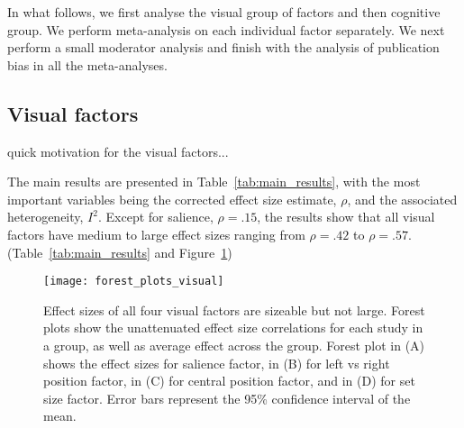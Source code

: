 \documentclass{article}
\begin{document}
In what follows, we first analyse the visual group of factors and then cognitive group. We perform meta-analysis on each individual factor  separately. We next perform a small moderator analysis and finish with the analysis of publication bias in all the meta-analyses.  


\subsection{Visual factors}

quick motivation for the visual factors...

The main results are presented in Table~\ref{tab:main_results}, with the most important variables being the corrected effect size estimate, $\rho$, and the associated heterogeneity, $I^2$. Except for salience, $\rho = .15$, the results show that all visual factors have medium to large effect sizes ranging from $\rho = .42$ to $\rho = .57$. (Table~\ref{tab:main_results} and Figure~\ref{fig:forest_plots_visual})






\begin{figure}%
\texttt{[image: forest\_plots\_visual]}
\centering
\caption{Effect sizes of all four visual factors are sizeable but not large. Forest plots show the unattenuated effect size correlations for each study in a group, as well as average effect across the group. Forest plot in (A) shows the effect sizes for salience factor, in (B) for left vs right position factor, in  (C) for central position factor, and in (D) for set size factor. Error bars represent the 95\% confidence interval of the mean.}
\label{fig:forest_plots_visual}
\end{figure}
\end{document}

